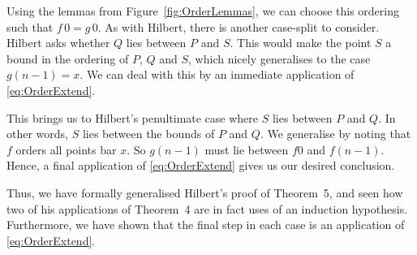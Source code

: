 Using the lemmas from Figure~\ref{fig:OrderLemmas}, we can choose this ordering such that $f\,0 = g\,0$. As with Hilbert, there is another case-split to consider. Hilbert asks whether $Q$ lies between $P$ and $S$. This would make the point $S$ a bound in the ordering of $P$, $Q$ and $S$, which nicely generalises to the case $g(n - 1) = x$. We can deal with this by an immediate application of \eqref{eq:OrderExtend}.

This brings us to Hilbert's penultimate case where $S$ lies between $P$ and $Q$. In other words, $S$ lies between the bounds of $P$ and $Q$. We generalise by noting that $f$ orders all points bar $x$. So $g(n - 1)$ must lie between $f 0$ and $f(n-1)$. Hence, a final application of \eqref{eq:OrderExtend} gives us our desired conclusion.

Thus, we have formally generalised Hilbert's proof of Theorem~5, and seen how two of his applications of Theorem~4 are in fact uses of an induction hypothesis. Furthermore, we have shown that the final step in each case is an application of \eqref{eq:OrderExtend}.